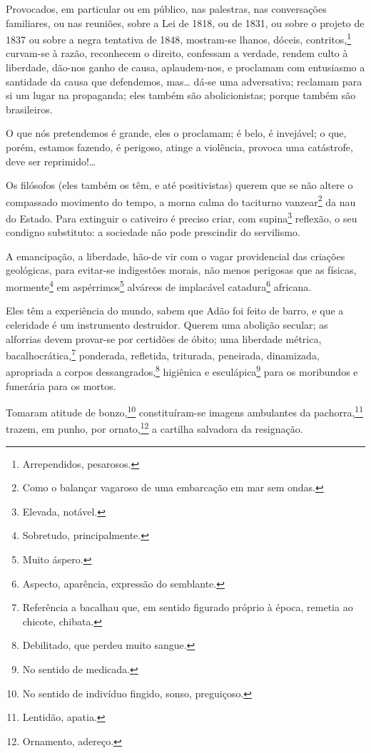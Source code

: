 {Provocados, em particular ou em público, nas palestras, nas conversações
familiares, ou nas reuniões, sobre a Lei de 1818, ou de 1831, ou sobre o
projeto de 1837 ou sobre a negra tentativa de 1848, mostram-se lhanos,
dóceis, contritos,\footnote{Arrependidos, pesarosos.} curvam-se à
razão, reconhecem o direito, confessam a verdade, rendem culto à
liberdade, dão-nos ganho de causa, aplaudem-nos, e proclamam com
entusiasmo a santidade da causa que defendemos, mas\ldots{} dá-se uma
adversativa; reclamam para si um lugar na propaganda; eles também são
abolicionistas; porque também são brasileiros.

O que nós pretendemos é grande, eles o proclamam; é belo, é invejável; o
que, porém, estamos fazendo, é perigoso, atinge a violência, provoca uma
catástrofe, deve ser reprimido!\ldots{}

Os filósofos (eles também os têm, e até positivistas) querem que se não
altere o compassado movimento do tempo, a morna calma do taciturno
vanzear\footnote{Como o balançar vagaroso de uma embarcação em mar sem
  ondas.} da nau do Estado. Para extinguir o cativeiro é preciso criar,
com supina\footnote{Elevada, notável.} reflexão, o seu condigno
substituto: a sociedade não pode prescindir do servilismo.

A emancipação, a liberdade, hão-de vir com o vagar providencial das
criações geológicas, para evitar-se indigestões morais, não menos
perigosas que as físicas, mormente\footnote{Sobretudo, principalmente.}
em aspérrimos\footnote{Muito áspero.} alváreos de implacável
catadura\footnote{Aspecto, aparência, expressão do semblante.}
africana.

Eles têm a experiência do mundo, sabem que Adão foi feito de barro, e 
que a celeridade é um instrumento destruidor. Querem uma abolição
secular; as alforrias devem provar-se por certidões de óbito; uma
liberdade métrica, bacalhocrática,\footnote{Referência a bacalhau que,
  em sentido figurado próprio à época, remetia ao chicote, chibata.}
ponderada, refletida, triturada, peneirada, dinamizada, apropriada a
corpos dessangrados,\footnote{Debilitado, que perdeu muito sangue.}
higiênica e esculápica\footnote{No sentido de medicada.} para os
moribundos e funerária para os mortos.

Tomaram atitude de bonzo,\footnote{No sentido de indivíduo fingido,
  sonso, preguiçoso.} constituíram-se imagens ambulantes da
pachorra,\footnote{Lentidão, apatia.} trazem, em punho, por
ornato,\footnote{Ornamento, adereço.} a cartilha salvadora da
resignação.

}
